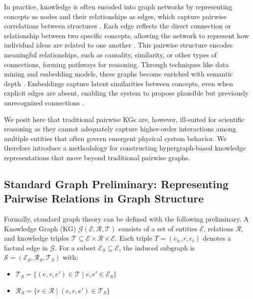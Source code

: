 \documentclass{article}
\begin{document}
In practice, knowledge is often encoded into graph networks by representing concepts as nodes and their relationships as edges, which capture pairwise correlations between structures \cite{Ehrlinger2016TowardsAD, Hogan_2021, Buehler2024, Liu2024}. Each edge reflects the direct connection or relationship between two specific concepts, allowing the network to represent how individual ideas are related to one another \cite{Ehrlinger2016TowardsAD, Hogan_2021}. This pairwise structure encodes meaningful relationships, such as causality, similarity, or other types of connections, forming pathways for reasoning. Through techniques like data mining and embedding models, these graphs become enriched with semantic depth \cite{grover2016node2vecscalablefeaturelearning, Tang_2015}. Embeddings capture latent similarities between concepts, even when explicit edges are absent, enabling the system to propose plausible but previously unrecognized connections \cite{Buehler2024, Ghafarollahi2024, Buehler2025GPReFLexOR, Buehler2025SelfOrganizingGraphReasoning}.

We posit here that traditional pairwise KGs are, however, ill-suited for scientific reasoning as they cannot adequately capture higher-order interactions among multiple entities that often govern emergent physical system behavior. We therefore introduce a methodology for constructing hypergraph-based knowledge representations that move beyond traditional pairwise graphs. 

\subsection{Standard Graph Preliminary: Representing Pairwise Relations in Graph Structure}

Formally, standard graph theory can be defined with the following preliminary. A Knowledge Graph (KG) $\mathcal{G}(\mathcal{E}, \mathcal{R}, \mathcal{T})$ consists of a set of entities $\mathcal{E}$, relations $\mathcal{R}$, and knowledge triples $\mathcal{T} \subseteq \mathcal{E} \times \mathcal{R} \times \mathcal{E}$. Each triple $T = (e_h, r, e_t)$ denotes a factual edge in $\mathcal{G}$. For a subset $\mathcal{E}_S \subseteq \mathcal{E}$, the induced subgraph is $\mathcal{S} = (\mathcal{E}_S, \mathcal{R}_S, \mathcal{T}_S)$ with:

\begin{itemize}
    \item $\mathcal{T}_S = \{(e, r, e') \in \mathcal{T} \mid e, e' \in \mathcal{E}_S\}$
    \item $\mathcal{R}_S = \{r \in \mathcal{R} \mid (e, r, e') \in \mathcal{T}_S\}$
\end{itemize}
\end{document}
